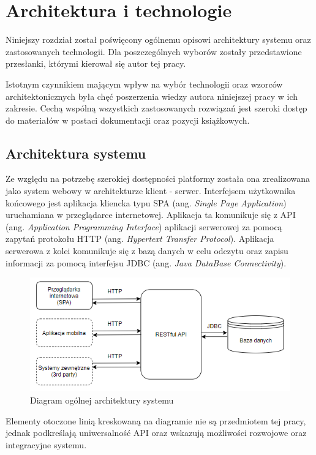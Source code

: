\chapter{Architektura i technologie}

Niniejszy rozdział został poświęcony ogólnemu opisowi architektury systemu oraz zastosowanych technologii. Dla poszczególnych wyborów zostały przedstawione przesłanki, którymi kierował się autor tej pracy. 

Istotnym czynnikiem mającym wpływ na wybór technologii oraz wzorców architektonicznych była chęć poszerzenia wiedzy autora niniejszej pracy w ich zakresie. Cechą wspólną wszystkich zastosowanych rozwiązań jest szeroki dostęp do materiałów w postaci dokumentacji oraz pozycji książkowych. 

\section{Architektura systemu}

Ze względu na potrzebę szerokiej dostępności platformy została ona zrealizowana jako system webowy w architekturze klient - serwer. Interfejsem użytkownika końcowego jest aplikacja kliencka typu SPA (ang. \textit{Single Page Application}) uruchamiana w przeglądarce internetowej. Aplikacja ta komunikuje się z API (ang. \textit{Application Programming Interface}) aplikacji serwerowej za pomocą zapytań protokołu HTTP (ang. \textit{Hypertext Transfer Protocol}).  Aplikacja serwerowa z kolei komunikuje się z bazą danych w celu odczytu oraz zapisu informacji za pomocą interfejsu JDBC (ang. \textit{Java DataBase Connectivity}). 

\begin{figure}[ht]
\centering
\includegraphics[width=0.8\linewidth]{05-architektura-i-technologie/rys/ogolna-architektura.PNG}
\caption{Diagram ogólnej architektury systemu}
\label{fig:diagram-og-architekt}
\end{figure}

Elementy otoczone linią kreskowaną na diagramie nie są przedmiotem tej pracy, jednak podkreślają uniwersalność API oraz wskazują możliwości rozwojowe oraz integracyjne systemu.

